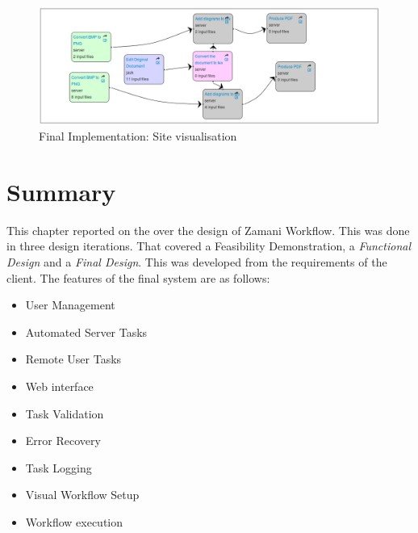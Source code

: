\begin{figure}[!h]
    \begin{center}
        \includegraphics[scale=0.45]{figures/final-visual.png}
    \end{center}
    \caption{Final Implementation: Site visualisation}
    \label{final:visual}
\end{figure}
\newpage
\section{Summary}
This chapter reported on the over the design of Zamani Workflow. This
was done in three design iterations. That covered a Feasibility Demonstration,
a \emph{Functional Design} and a \emph{Final Design}. This was developed from
the requirements of the client.  The features of the final system are as follows:
\begin{itemize}
   \item User Management
   \item Automated Server Tasks
   \item Remote User Tasks
   \item Web interface
   \item Task Validation
   \item Error Recovery
   \item Task Logging
   \item Visual Workflow Setup
   \item Workflow execution
\end{itemize}

